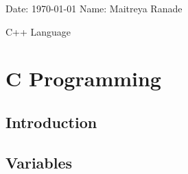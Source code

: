 \documentclass[12pt, a4paper]{article}
\begin{document}
	\onehalfspacing
	Date: \today{} \hfill{} Name: Maitreya Ranade
	\begin{center}
		\vspace*{\fill}
		{\LARGE C++ Language} \\
		\vspace*{\fill}
	\end{center}
	
	\pagebreak
	\singlespacing
	\tableofcontents
	\pagebreak
	
    \chapter{C Programming}

    \section{Introduction}
    
    \clearpage
    
    \section{Variables}
    
    \clearpage
\end{document}
